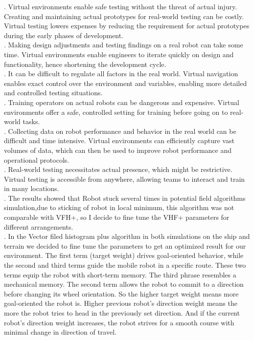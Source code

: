 . Virtual environments enable safe testing without the threat of actual injury. Creating and maintaining actual prototypes for real-world testing can be costly. Virtual testing lowers expenses by reducing the requirement for actual prototypes during the early phases of development.\\

. Making design adjustments and testing findings on a real robot can take some time. Virtual environments enable engineers to iterate quickly on design and functionality, hence shortening the development cycle.\\

. It can be difficult to regulate all factors in the real world. Virtual navigation enables exact control over the environment and variables, enabling more detailed and controlled testing situations.\\

. Training operators on actual robots can be dangerous and expensive. Virtual environments offer a safe, controlled setting for training before going on to real-world tasks.  \\

. Collecting data on robot performance and behavior in the real world can be difficult and time intensive. Virtual environments can efficiently capture vast volumes of data, which can then be used to improve robot performance and operational protocols.\\

. Real-world testing necessitates actual presence, which might be restrictive. Virtual testing is accessible from anywhere, allowing teams to interact and train in many locations.\\

. The results showed that Robot stuck several times in potential field algorithms simulation,due to sticking of robot in local minimum, this algorithm was not comparable with VFH+, so I decide to fine tune the VHF+ parameters for different arrangements.   \\

. In the Vector filed histogram plus algorithm in both simulations on the ship and terrain we decided to fine tune the parameters to get an optimized result for our environment. The first term (target weight) drives goal-oriented behavior, while the second and third terms  guide the mobile robot in a specific route. These two terms equip the robot with short-term memory. The third phrase resembles a mechanical memory. The second term allows the robot to commit to a direction before changing its wheel orientation. So the higher target weight means more goal-oriented the robot is. Higher previous robot's direction weight means the more the robot tries to head in the previously set direction. And if the current robot's direction weight  increases, the robot strives for a smooth course with minimal change in direction of travel. 
